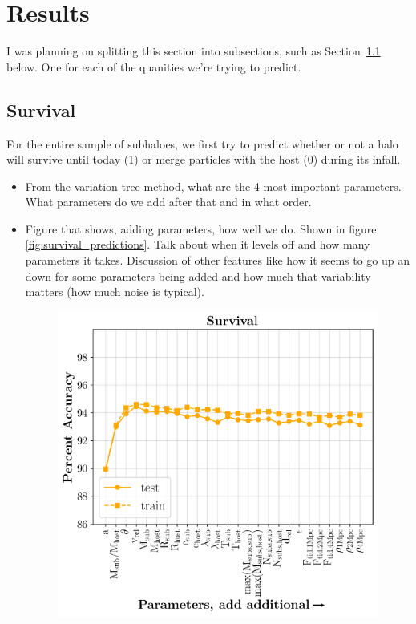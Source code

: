 \documentclass[fleqn,usenatbib]{mnras}
\begin{document}
\section{Results}
I was planning on splitting this section into subsections, such as Section~\ref{sec:survival} below. One for each of the quanities we're trying to predict.

\subsection{Survival}
\label{sec:survival} %
For the entire sample of subhaloes, we first try to predict whether or not a halo will survive until today (1) or merge particles with the host (0) during its infall.
\begin{itemize}
	\item From the variation tree method, what are the 4 most important parameters. What parameters do we add after that and in what order.
	\item Figure that shows, adding parameters, how well we do. Shown in figure \ref{fig:survival_predictions}. Talk about when it levels off and how many parameters it takes. Discussion of other features like how it seems to go up an down for some parameters being added and how much that variability matters (how much noise is typical).
\begin{figure}[h]
	\includegraphics[width=\columnwidth]{Figures/survival_predictions}

\end{figure}
\end{itemize}
\end{document}
